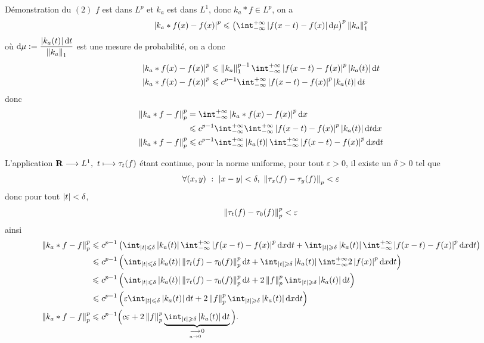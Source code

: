 \documentclass[a4paper,11pt, twoside]{article}
\begin{document}
\begin{ProofC}{Démonstration du $(\mathit 2)$}
  $f$ est dans $L^p$ et $k_a$ est dans $L^1$, donc $k_a*f\in L^p$, on a 
  $$\abs{k_a*f(x)-f(x)}^p\leqslant\Par{\intr\abs{f(x-t)-f(x)}\dmu}^p\norm{k_a}_1^p$$
  où $\mathrm d\mu:=\displaystyle\frac{\left| k_a(t)\right|\mathrm dt}{\left\lVert k_a\right\rVert_1}$ est une mesure de probabilité, on a donc
  \begin{align*}
    \abs{k_a*f(x)-f(x)}^p&\leqslant\norm{k_a}_1^{p-1}\intr\abs{f(x-t)-f(x)}^p\abs{k_a(t)}\dt\\
    \abs{k_a*f(x)-f(x)}^p&\leqslant c^{p-1}\intr\abs{f(x-t)-f(x)}^p\abs{k_a(t)}\dt
  \end{align*}
  donc 
  \begin{align*}
    \norm{k_a*f-f}_p^p&=\intr\abs{k_a*f(x)-f(x)}^p\dx\\
    &\leqslant c^{p-1}\intr\intr\abs{f(x -t)-f(x)}^p\abs{k_a(t)}\dt\dx\\
    \norm{k_a*f-f}_p^p&\leqslant c^{p-1}\intr\abs{k_a(t)}\intr\abs{f(x-t)-f(x)}^p\dx\dt\\
  \end{align*}
  
  L'application $\R\longrightarrow L^1,\ t\longmapsto \tau_t(f)$ étant continue, pour la norme uniforme, pour tout $\varepsilon>0$, il existe un $\delta>0$ tel que 
  $$\forall (x,y)\ :\ \abs{x-y}<\delta,\ \norm{\tau_x(f)-\tau_y(f)}_p<\varepsilon$$
  donc pour tout $\left| t\right|<\delta$,
  $$\left\lVert\tau_t(f)-\tau_0(f)\right\rVert_p^p<\varepsilon$$
  ainsi 
  \begin{align*}
    \norm{k_a*f-f}_p^p&\leqslant c^{p-1}\Par{ \int_{\abs t\leqslant \delta}\abs{k_a(t)}\intr\abs{f(x-t)-f(x)}^p\dx\dt+\int_{\abs t\geqslant \delta}\abs{k_a(t)}\intr\abs{f(x-t)-f(x)}^p\dx\dt}\\
    &\leqslant c^{p-1}\Par{ \int_{\abs t\leqslant \delta}\abs{k_a(t)}\norm{\tau_t(f)-\tau_0(f)}_p^p\dt+\int_{\abs t\geqslant \delta}\abs{k_a(t)}\intr2\abs{f(x)}^p\dx\dt}\\
    &\leqslant c^{p-1}\Par{ \int_{\abs t\leqslant \delta}\abs{k_a(t)}\norm{\tau_t(f)-\tau_0(f)}_p^p\dt+2\norm{f}_p^p\int_{\abs t\geqslant \delta}\abs{k_a(t)}\dt}\\
    &\leqslant c^{p-1}\Par{ \varepsilon\int_{\abs t\leqslant \delta}\abs{k_a(t)}\dt+2\norm{f}_p^p\int_{\abs t\geqslant \delta}\abs{k_a(t)}\dx\dt}\\
    \norm{k_a*f-f}_p^p&\leqslant c^{p-1}\Big( c\varepsilon+2\norm{f}_p^p\underbrace{\int_{\abs t\geqslant \delta}\abs{k_a(t)}\dt}_{\underset{a\to 0}{\longrightarrow}0}\Big).
  \end{align*}

\end{ProofC}
\end{document}
